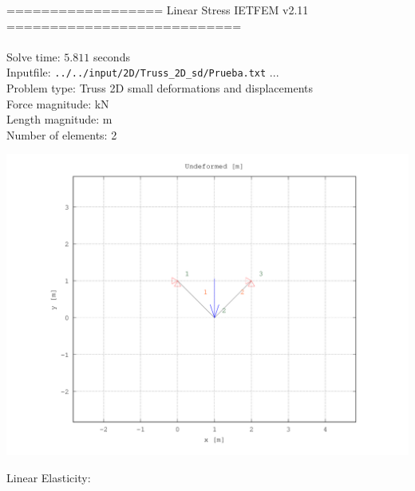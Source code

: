 \documentclass[a4paper,11pt]{article}
\begin{document}

================== Linear Stress IETFEM v2.11 ===========================\\\\


Solve time: $ 5.811$ seconds \\

Inputfile: \verb|../../input/2D/Truss_2D_sd/Prueba.txt|  ... \\

Problem type: Truss 2D small deformations and displacements\\ 

Force magnitude: kN \\

Length magnitude: m \\

Number of elements: 2 \\

\newpage       

\begin{center}       
\includegraphics[width=.80\textwidth]{../../Prueba_undeformed.png}   
   \end{center}       

Linear Elasticity:\\
\end{document}
